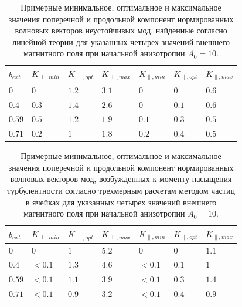 \begin{table}
\centering
\begin{tabular}{ |p{1.5cm}|p{1.5cm}|p{1.5cm}|p{1.5cm}|p{1.5cm}|p{1.5cm}|p{1.5cm}|   }
 \hline
 $b_{ext}$ & $K_{\perp,min}$ & $K_{\perp,opt}$ & $K_{\perp,max}$ & $K_{\|,min}$ & $K_{\|,opt}$ & $K_{\|,max}$\\
 \hline
 $0$ & $0$ & $1.2$ & $3.1$  & $0$ & $0$ & $0.6$ \\
 $0.4$ & $0.3$ & $1.4$ & $2.6$  & $0$ & $0.1$ & $0.6$ \\
 $0.59$ & $0.5$ & $1.2$ & $1.9$ & $0.1$ & $0.3$ & $0.5$\\
 $0.71$ &  $0.2$ & $1$ & $1.8$  & $0.2$ & $0.4$ & $0.5$\\
 \hline

 \end{tabular}
 \caption{Примерные минимальное, оптимальное и максимальное значения поперечной и продольной компонент нормированных волновых векторов неустойчивых мод, найденные согласно линейной теории для указанных четырех значений внешнего магнитного поля при начальной анизотропии $A_0=10$.}
\end{table}


\begin{table}
\centering
\begin{tabular}{ |p{1.5cm}|p{1.5cm}|p{1.5cm}|p{1.5cm}|p{1.5cm}|p{1.5cm}|p{1.5cm}|   }
 \hline
 $b_{ext}$ & $K_{\perp,min}$ & $K_{\perp,opt}$ & $K_{\perp,max}$ & $K_{\|,min}$ & $K_{\|,opt}$ & $K_{\|,max}$\\
 \hline
 $0$ & $0$ & $1$  & $5.2$  & $0$ & $0$  & $1.1$ \\
 $0.4$ &  $<0.1$ & $1.3$  & $4.6$  & $<0.1$ & $0.1$  & $1$ \\
 $0.59$ &  $<0.1$ & $1.1$  & $3.9$  & $<0.1$ & $0.3$  & $1.4$ \\
 $0.71$ &   $<0.1$ & $0.9$  & $3.2$  & $<0.1$ & $0.4$  & $0.9$ \\
 \hline

 \end{tabular}
 \caption{Примерные минимальное, оптимальное и максимальное значения поперечной и продольной компонент нормированных волновых векторов мод, возбужденных к моменту насыщения турбулентности согласно трехмерным расчетам методом частиц в ячейках для указанных четырех значений внешнего магнитного поля при начальной анизотропии $A_0=10$.}
\end{table}




